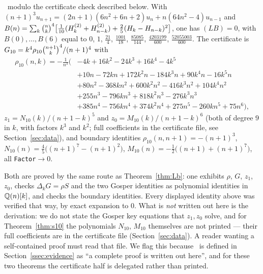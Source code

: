 \begin{theorem}[$s_{10}=\sum_k\bin nk^4$]\label{thm:s10}
\Proved\ modulo the certificate check described below.
With $(n+1)^3u_{n+1}=(2n+1)(6n^2+6n+2)u_n+n(64n^2-4)u_{n-1}$ and
$B(n)=\sum_k\binom{n}{k}^4\bigl[\tfrac1{10}(H^{(2)}_{k}+H^{(2)}_{n-k})+\tfrac25(H_k-H_{n-k})^2\bigr]$,
one has $(LB)=0$, with $B(0),\dots,B(6)$ equal to
$0$, $1$, $\tfrac{21}4$, $\tfrac{1001}{18}$, $\tfrac{85085}{144}$,
$\tfrac{4203199}{600}$, $\tfrac{52055003}{600}$.
The certificate is $G_{10}=k^4\rho_{10}\binom{n+1}{k}^4/(n+1)^4$ with
{\small
\begin{align*}
 \rho_{10}(n,k)=-\tfrac1{n^3}\bigl(&-4k+16k^2-24k^3+16k^4-4k^5\\
 &+10n-72kn+172k^2n-184k^3n+90k^4n-16k^5n\\
 &+80n^2-368kn^2+600k^2n^2-416k^3n^2+104k^4n^2\\
 &+255n^3-796kn^3+818k^2n^3-276k^3n^3\\
 &+385n^4-756kn^4+374k^2n^4+275n^5-260kn^5+75n^6\bigr),
\end{align*}}
$z_1=N_{10}(k)/(n+1-k)^5$ and $z_0=M_{10}(k)/(n+1-k)^6$ (both of degree $9$ in $k$, with
factors $k^3$ and $k^2$; full coefficients in the certificate file, see
Section~\ref{sec:data}), and boundary identities $\rho_{10}(n,n+1)=-(n+1)^3$,
$N_{10}(n)=\tfrac45\bigl((n+1)^7-(n+1)^2\bigr)$,
$M_{10}(n)=-\tfrac12\bigl((n+1)+(n+1)^7\bigr)$, all \texttt{Factor}$\to0$.
\end{theorem}

\begin{remark}\label{rem:certstatus}
Both are proved by the same route as Theorem~\ref{thm:Lb}: one exhibits $\rho$, $G$,
$z_1$, $z_0$, checks $\Delta_k G=\rho S$ and the two Gosper identities as polynomial identities
in $\mathbb{Q}(n)[k]$, and checks the boundary identities. Every displayed identity above was verified
that way, by exact expansion to $0$. What is \emph{not} written out here is the derivation: we
do not state the Gosper key equations that $z_1,z_0$ solve, and for Theorem~\ref{thm:s10} the
polynomials $N_{10}$, $M_{10}$ themselves are not printed --- their full coefficients are in the
certificate file (Section~\ref{sec:data}). A reader wanting a self-contained proof must read
that file. We flag this because \Proved\ is defined in Section~\ref{ssec:evidence} as ``a
complete proof is written out here'', and for these two theorems the certificate half is
delegated rather than printed.
\end{remark}

